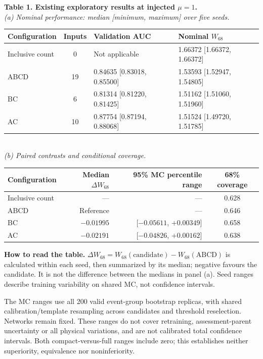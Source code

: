 \documentclass[11pt,a4paper]{article}
\newcommand{\W}{W_{68}}
\begin{document}
\begin{center}
\textbf{Table 1. Existing exploratory results at injected $\mu=1$.}\\[0.6em]
\textit{(a) Nominal performance: median [minimum, maximum] over five seeds.}\\[0.3em]
\begin{tabular}{lcll}
\toprule
Configuration & Inputs & Validation AUC & Nominal $\W$\\
\midrule
Inclusive count & 0 & Not applicable & 1.66372 [1.66372, 1.66372]\\
ABCD & 19 & 0.84635 [0.83018, 0.85500] & 1.53593 [1.52947, 1.54805]\\
BC & 6 & 0.81314 [0.81220, 0.81425] & 1.51162 [1.51060, 1.51960]\\
AC & 10 & 0.87754 [0.87194, 0.88068] & 1.51524 [1.49720, 1.51785]\\
\bottomrule
\end{tabular}\\[1em]
\textit{(b) Paired contrasts and conditional coverage.}\\[0.3em]
\begin{tabular}{lrrc}
\toprule
Configuration & Median $\Delta\W$ & 95\% MC percentile range
 & 68\% coverage\\
\midrule
Inclusive count & --- & --- & 0.628\\
ABCD & Reference & --- & 0.646\\
BC & $-0.01995$ & [$-0.05611$, $+0.00349$] & 0.658\\
AC & $-0.02191$ & [$-0.04826$, $+0.00162$] & 0.638\\
\bottomrule
\end{tabular}
\end{center}

\textbf{How to read the table.}
$\Delta\W=\W(\mathrm{candidate})-\W(\mathrm{ABCD})$ is calculated within
each seed, then summarized by its median; negative favours the candidate.
It is not the difference between the medians in panel (a). Seed ranges
describe training variability on shared MC, not confidence intervals.

The MC ranges use all 200 valid event-group bootstrap replicas, with shared
calibration/template resampling across candidates and threshold reselection.
Networks remain fixed. These ranges do not cover retraining, assessment-parent
uncertainty or all physical variations, and are not calibrated total confidence
intervals. Both compact-versus-full ranges include zero; this establishes
neither superiority, equivalence nor noninferiority.
\end{document}
